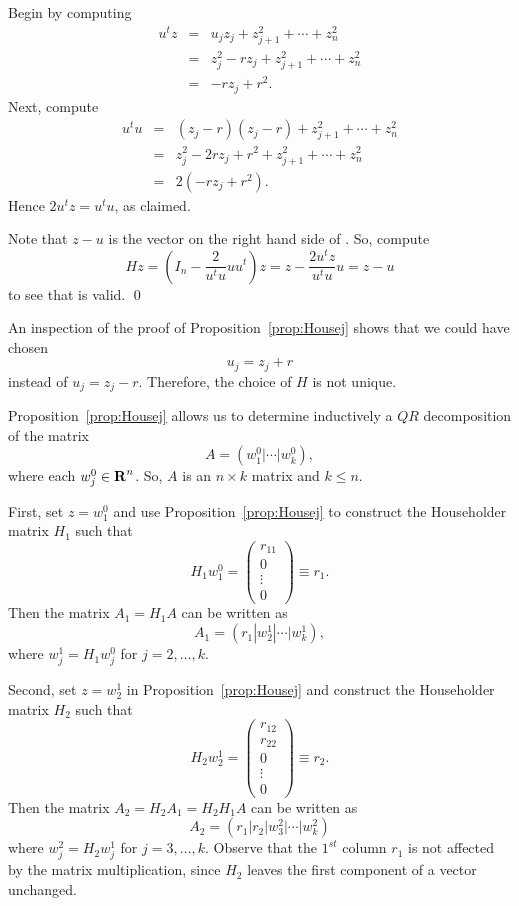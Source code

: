 \proof  Begin by computing
\begin{eqnarray*}
u^t z &=& u_j z_j + z_{j+1}^2 + \cdots + z_n^2 \\
& = & z_j^2 -rz_j +  z_{j+1}^2 + \cdots + z_n^2 \\
& = &  - rz_j + r^2.
\end{eqnarray*}
Next, compute
\begin{eqnarray*}
u^t u & = &  (z_j-r)(z_j-r) + z_{j+1}^2 + \cdots + z_n^2 \\
& = &  z_j^2 - 2rz_j + r^2 +  z_{j+1}^2 + \cdots + z_n^2 \\
& = & 2(-rz_j + r^2).
\end{eqnarray*}
Hence $2u^tz = u^t u$, as claimed.

Note that $z-u$ is the vector on the right hand side of .
So, compute
\[
Hz = \left(I_n - \frac{2}{u^tu} u u^t\right)z = z -\frac{2u^t z}{u^tu} u = z-u
\]
to see that  is valid.  \qed

An inspection of the proof of Proposition~\ref{prop:Housej} shows that we
could have chosen
\[
u_j = z_j + r
\]
instead of $u_j=z_j - r$.  Therefore, the choice of $H$ is not unique.

Proposition~\ref{prop:Housej} allows us to determine inductively a $QR$
decomposition of the matrix
\[
A=(w_1^0|\cdots|w_k^0),
\]
where each $w_j^0\in\mbox{$\bf{R}$}^n$.  So, $A$ is an $n\times k$ matrix and $k\leq n$.

First, set $z = w_1^0$ and use Proposition~\ref{prop:Housej} to construct the
Householder matrix $H_1$ such that
\[
H_1 w_1^0 =\left(\begin{array}{c} r_{11}\\ 0 \\ \vdots\\ 0 \end{array}\right)
\equiv r_1.
\]
Then the matrix $A_1=H_1A$ can be written as
\[
A_1=(r_1|w_2^1|\cdots|w_k^1),
\]
where $w_j^1=H_1w_j^0$ for $j=2,\ldots,k$.

Second, set $z=w_2^1$ in Proposition~\ref{prop:Housej} and construct the
Householder matrix $H_2$ such that
\[
H_2 w_2^1 =\left(\begin{array}{c} r_{12}\\ r_{22}\\ 0 \\ \vdots\\ 0
\end{array}\right) \equiv r_2.
\]
Then the matrix $A_2=H_2A_1=H_2H_1A$ can be written as
\[
A_2=(r_1|r_2|w_3^2|\cdots|w_k^2)
\]
where $w_j^2=H_2w_j^1$ for $j=3,\ldots,k$. Observe that the $1^{st}$ column
$r_1$ is not affected by the matrix multiplication, since $H_2$ leaves the
first component of a vector unchanged.

